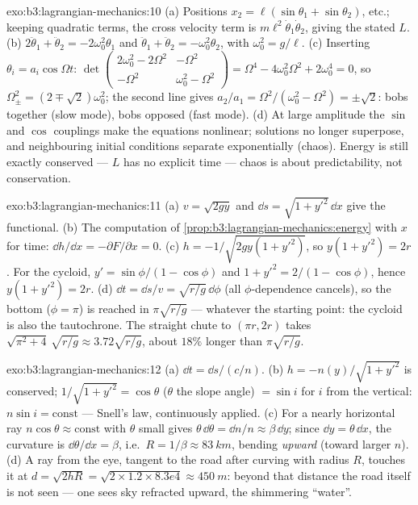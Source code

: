\begin{solution}{exo:b3:lagrangian-mechanics:10}
(a) Positions $x_2 = \ell(\sin\theta_1 + \sin\theta_2)$, etc.; keeping
quadratic terms, the cross velocity term is
$m\ell^2\dot\theta_1\dot\theta_2$, giving the stated $L$. (b)
$2\ddot\theta_1 + \ddot\theta_2 = -2\omega_0^2\theta_1$ and
$\ddot\theta_1 + \ddot\theta_2 = -\omega_0^2\theta_2$, with $\omega_0^2
= g/\ell$. (c) Inserting $\theta_i = a_i\cos\Omega t$:
$\det\begin{pmatrix} 2\omega_0^2 - 2\Omega^2 & -\Omega^2\\ -\Omega^2 &
\omega_0^2 - \Omega^2\end{pmatrix} = \Omega^4 - 4\omega_0^2\Omega^2 +
2\omega_0^4 = 0$, so $\Omega_\pm^2 = (2 \mp \sqrt2)\omega_0^2$; the
second line gives $a_2/a_1 = \Omega^2/(\omega_0^2 - \Omega^2) =
\pm\sqrt2$: bobs together (slow mode), bobs opposed (fast mode). (d)
At large amplitude the $\sin$ and $\cos$ couplings make the equations
nonlinear; solutions no longer superpose, and neighbouring initial
conditions separate exponentially (chaos). Energy is still exactly
conserved --- $L$ has no explicit time --- chaos is about
predictability, not conservation.
\end{solution}

\begin{solution}{exo:b3:lagrangian-mechanics:11}
(a) $v = \sqrt{2gy}$ and $\dd s = \sqrt{1 + y'^2}\,\dd x$ give the
functional. (b) The computation of
\cref{prop:b3:lagrangian-mechanics:energy} with $x$ for time: $\dd
h/\dd x = -\partial F/\partial x = 0$. (c) $h = -1/\sqrt{2gy(1 +
y'^2)}$, so $y(1 + y'^2) = 2r$. For the cycloid, $y' =
\sin\phi/(1 - \cos\phi)$ and $1 + y'^2 = 2/(1 - \cos\phi)$, hence
$y(1 + y'^2) = 2r$. (d) $\dd t = \dd s/v = \sqrt{r/g}\,\dd\phi$ (all
$\phi$-dependence cancels), so the bottom ($\phi = \pi$) is reached in
$\pi\sqrt{r/g}$ --- whatever the starting point: the cycloid is also
the tautochrone. The straight chute to $(\pi r, 2r)$ takes $\sqrt{\pi^2
+ 4}\,\sqrt{r/g} \approx 3.72\sqrt{r/g}$, about $18\%$ longer than
$\pi\sqrt{r/g}$.
\end{solution}

\begin{solution}{exo:b3:lagrangian-mechanics:12}
(a) $\dd t = \dd s/(c/n)$. (b) $h = -n(y)/\sqrt{1 + y'^2}$ is
conserved; $1/\sqrt{1 + y'^2} = \cos\theta$ ($\theta$ the slope angle)
$= \sin i$ for $i$ from the vertical: $n\sin i = \text{const}$ ---
Snell's law, continuously applied. (c) For a nearly horizontal ray
$n\cos\theta \approx \text{const}$ with $\theta$ small gives
$\theta\,\dd\theta = \dd n/n \approx \beta\,\dd y$; since $\dd y =
\theta\,\dd x$, the curvature is $\dd\theta/\dd x = \beta$, i.e.\ $R =
1/\beta \approx \qty{83}{km}$, bending \emph{upward} (toward larger
$n$). (d) A ray from the eye, tangent to the road after curving with
radius $R$, touches it at $d = \sqrt{2hR} = \sqrt{2 \times 1.2 \times
8.3e4} \approx \qty{450}{m}$: beyond that distance the road itself is
not seen --- one sees sky refracted upward, the shimmering ``water''.
\end{solution}

